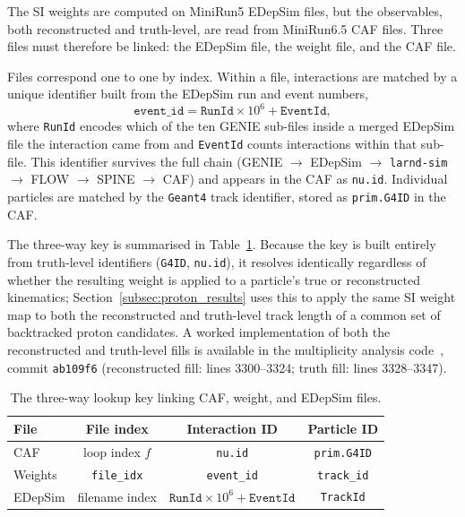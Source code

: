 \documentclass[%
article,
nofootinbib
]{revtex4-2}
\DeclareRobustCommand{\gfour}{\texttt{Geant4}}
\begin{document}
The SI weights are computed on MiniRun5 EDepSim files, but the observables,
both reconstructed and truth-level, are read from MiniRun6.5 CAF files. Three
files must therefore be linked: the EDepSim file, the weight file, and the CAF
file.

Files correspond one to one by index. Within a file, interactions are matched by
a unique identifier built from the EDepSim run and event numbers,
\begin{equation}
\label{eq:vertex_id}
\texttt{event\_id} = \texttt{RunId} \times 10^{6} + \texttt{EventId},
\end{equation}
where \texttt{RunId} encodes which of the ten GENIE sub-files inside a merged
EDepSim file the interaction came from and \texttt{EventId} counts interactions
within that sub-file. This identifier survives the full chain
(GENIE $\rightarrow$ EDepSim $\rightarrow$ \texttt{larnd-sim} $\rightarrow$ FLOW $\rightarrow$ SPINE $\rightarrow$ CAF)
and appears in the CAF as \texttt{nu.id}. Individual particles are matched by
the \gfour{} track identifier, stored as \texttt{prim.G4ID} in the CAF.

The three-way key is summarised in Table~\ref{tab:matching_key}. Because the key
is built entirely from truth-level identifiers (\texttt{G4ID}, \texttt{nu.id}),
it resolves identically regardless of whether the resulting weight is applied to
a particle's true or reconstructed kinematics; Section~\ref{subsec:proton_results}
uses this to apply the same SI weight map to both the reconstructed and
truth-level track length of a common set of backtracked proton candidates. A
worked implementation of both the reconstructed and truth-level fills is
available in the multiplicity analysis code~\cite{proton_plots_repo}, commit
\texttt{ab109f6} (reconstructed fill: lines 3300--3324; truth fill: lines
3328--3347).

\begin{table}[H]
\centering
\caption{The three-way lookup key linking CAF, weight, and EDepSim files.}
\label{tab:matching_key}
\setlength{\tabcolsep}{18pt}
\begin{tabular}{lccc}
\hline\hline
File & File index & Interaction ID & Particle ID \\
\hline
CAF     & loop index $f$     & \texttt{nu.id}   & \texttt{prim.G4ID} \\
Weights & \texttt{file\_idx} & \texttt{event\_id} & \texttt{track\_id} \\
EDepSim & filename index     & $\texttt{RunId}\times10^{6} + \texttt{EventId}$ & \texttt{TrackId} \\
\hline\hline
\end{tabular}
\end{table}
\end{document}
